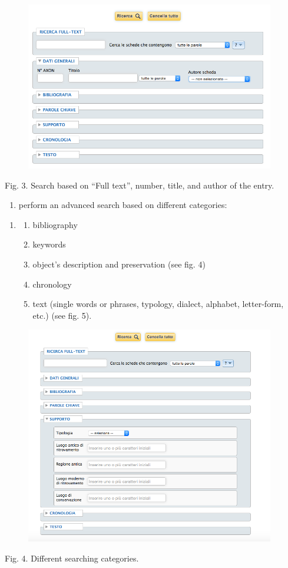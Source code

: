 \documentclass[amsthm,ebook]{saparticle}
\begin{document}
\begin{figure}
\centering
\includegraphics[width=10.88cm,height=7.354cm]{EAGLE2016FullPaperrevised-img003.png}
\end{figure}
Fig. 3. Search based on “Full text”, number, title, and author of the entry.


\bigskip

\begin{enumerate}
\item perform an advanced search based on different categories: 
\end{enumerate}
\begin{enumerate}
\item \begin{enumerate}
\item bibliography
\item keywords
\item object’s description and preservation (see fig. 4)
\item chronology
\item text (single words or phrases, typology, dialect, alphabet, letter-form, etc.) (see fig. 5).
\end{enumerate}
\end{enumerate}

\bigskip


\bigskip



\begin{figure}
\centering
\includegraphics[width=10.88cm,height=9.518cm]{EAGLE2016FullPaperrevised-img004.png}
\end{figure}
Fig. 4. Different searching categories.
\end{document}
